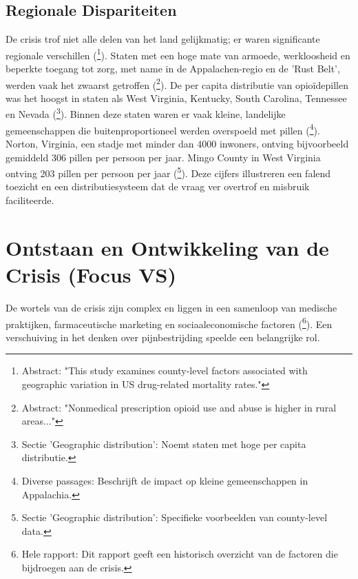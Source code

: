 \documentclass[11pt, a4paper]{report} %
\begin{document}
\subsection{Regionale Dispariteiten}
De crisis trof niet alle delen van het land gelijkmatig; er waren significante regionale verschillen (\cite{Monnat2018FactorsCountyLevelDrugMortality}\footnote{Abstract: "This study examines county-level factors associated with geographic variation in US drug-related mortality rates."}). Staten met een hoge mate van armoede, werkloosheid en beperkte toegang tot zorg, met name in de Appalachen-regio en de 'Rust Belt', werden vaak het zwaarst getroffen (\cite{Keyes2014RuralUrbanOpioidUse}\footnote{Abstract: "Nonmedical prescription opioid use and abuse is higher in rural areas..."}). De per capita distributie van opioïdepillen was het hoogst in staten als West Virginia, Kentucky, South Carolina, Tennessee en Nevada (\cite{WikipediaOpioidEpidemicUS}\footnote{Sectie 'Geographic distribution': Noemt staten met hoge per capita distributie.}). Binnen deze staten waren er vaak kleine, landelijke gemeenschappen die buitenproportioneel werden overspoeld met pillen (\cite{Macy2018Dopesick}\footnote{Diverse passages: Beschrijft de impact op kleine gemeenschappen in Appalachia.}). Norton, Virginia, een stadje met minder dan 4000 inwoners, ontving bijvoorbeeld gemiddeld 306 pillen per persoon per jaar. Mingo County in West Virginia ontving 203 pillen per persoon per jaar (\cite{WikipediaOpioidEpidemicUS}\footnote{Sectie 'Geographic distribution': Specifieke voorbeelden van county-level data.}). Deze cijfers illustreren een falend toezicht en een distributiesysteem dat de vraag ver overtrof en misbruik faciliteerde.

\section{Ontstaan en Ontwikkeling van de Crisis (Focus VS)}
De wortels van de crisis zijn complex en liggen in een samenloop van medische praktijken, farmaceutische marketing en sociaaleconomische factoren (\cite{CRS2022OpioidCrisisHistory}\footnote{Hele rapport: Dit rapport geeft een historisch overzicht van de factoren die bijdroegen aan de crisis.}). Een verschuiving in het denken over pijnbestrijding speelde een belangrijke rol.
\end{document}
